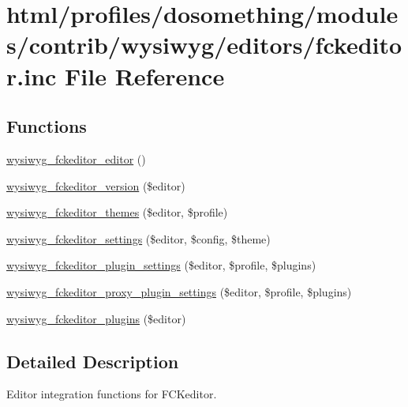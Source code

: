 \hypertarget{fckeditor_8inc}{
\section{html/profiles/dosomething/modules/contrib/wysiwyg/editors/fckeditor.inc File Reference}
\label{fckeditor_8inc}
}
\subsection*{Functions}
\begin{DoxyCompactItemize}
\item 
\hyperlink{fckeditor_8inc_a72a46c17832dfedbb0931bd88b610d7f}{wysiwyg\_\-fckeditor\_\-editor} ()
\item 
\hyperlink{fckeditor_8inc_a0e38c82f156154b3dc7e2475a6ca0ba0}{wysiwyg\_\-fckeditor\_\-version} (\$editor)
\item 
\hyperlink{fckeditor_8inc_a6549e60ed414a5048679bd626ea3fbeb}{wysiwyg\_\-fckeditor\_\-themes} (\$editor, \$profile)
\item 
\hyperlink{fckeditor_8inc_aa8f803e4342076c84b4c091282837ea0}{wysiwyg\_\-fckeditor\_\-settings} (\$editor, \$config, \$theme)
\item 
\hyperlink{fckeditor_8inc_adf8922bafbaf68b19c78168dc6b4e5c9}{wysiwyg\_\-fckeditor\_\-plugin\_\-settings} (\$editor, \$profile, \$plugins)
\item 
\hyperlink{fckeditor_8inc_a6a13c730790d46d1dfd2f9e5840f4617}{wysiwyg\_\-fckeditor\_\-proxy\_\-plugin\_\-settings} (\$editor, \$profile, \$plugins)
\item 
\hyperlink{fckeditor_8inc_a345fbf4815a7bbc90ec93a0b198d7c1d}{wysiwyg\_\-fckeditor\_\-plugins} (\$editor)
\end{DoxyCompactItemize}


\subsection{Detailed Description}
Editor integration functions for FCKeditor. 

